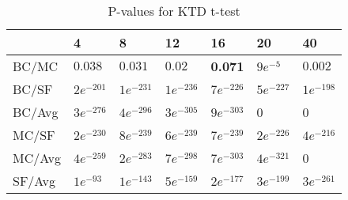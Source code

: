 \begin{table}[H]
	\centering
	\begin{tabular}{|l|llllll|}\hline
		& 4 & 8 & 12 & 16 & 20 & 40 \\\hline
		BC/MC	& $0.038$	& $0.031$	& $0.02$	& \textbf{0.071}	& $9e^{-5}$	& $0.002$ \\
		BC/SF	& $2e^{-201}$	& $1e^{-231}$	& $1e^{-236}$	& $7e^{-226}$ & $5e^{-227}$ & $1e^{-198}$ \\
		BC/Avg	& $3e^{-276}$	& $4e^{-296}$ 	& $3e^{-305}$	& $9e^{-303}$	& 0 & 0 \\
		MC/SF	& $2e^{-230}$	& $8e^{-239}$ 	& $6e^{-239}$	& $7e^{-239}$	& $2e^{-226}$ & $4e^{-216}$ \\
		MC/Avg	& $4e^{-259}$	& $2e^{-283}$ 	& $7e^{-298}$	& $7e^{-303}$ & $4e^{-321}$ & 0 \\
		SF/Avg	& $1e^{-93}$	& $1e^{-143}$ 	& $5e^{-159}$	& $2e^{-177}$	& $3e^{-199}$ & $3e^{-261}$ \\ \hline
	\end{tabular}
	\caption{P-values for KTD t-test}
	\label{tbl:ktd_ttest}
\end{table}